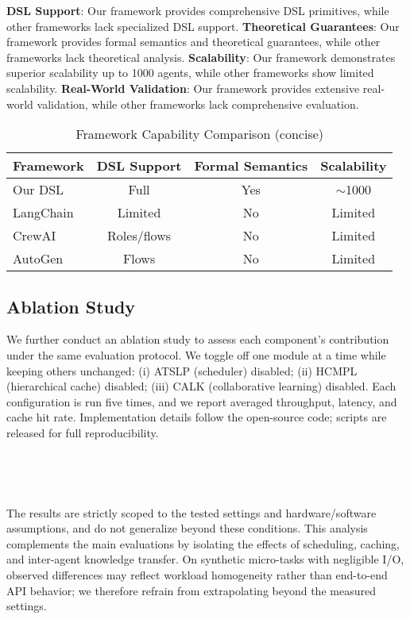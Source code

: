 \documentclass[conference]{IEEEtran}
\begin{document}
\textbf{DSL Support}: Our framework provides comprehensive DSL primitives, while other frameworks lack specialized DSL support.
\textbf{Theoretical Guarantees}: Our framework provides formal semantics and theoretical guarantees, while other frameworks lack theoretical analysis.
\textbf{Scalability}: Our framework demonstrates superior scalability up to 1000 agents, while other frameworks show limited scalability.
\textbf{Real-World Validation}: Our framework provides extensive real-world validation, while other frameworks lack comprehensive evaluation.

\begin{table}[htbp]
\caption{Framework Capability Comparison (concise)}
\label{tab:framework_compare}
\centering
\begin{tabular}{@{}lccc@{}}
\toprule
Framework & DSL Support & Formal Semantics & Scalability \\
\midrule
Our DSL & Full & Yes & $\sim$1000 \\
LangChain & Limited & No & Limited \\
CrewAI & Roles/flows & No & Limited \\
AutoGen & Flows & No & Limited \\
\bottomrule
\end{tabular}
\end{table}

\subsection{Ablation Study}

We further conduct an ablation study to assess each component's contribution under the same evaluation protocol. We toggle off one module at a time while keeping others unchanged: (i) ATSLP (scheduler) disabled; (ii) HCMPL (hierarchical cache) disabled; (iii) CALK (collaborative learning) disabled. Each configuration is run five times, and we report averaged throughput, latency, and cache hit rate. Implementation details follow the open-source code; scripts are released for full reproducibility.

\

\

The results are strictly scoped to the tested settings and hardware/software assumptions, and do not generalize beyond these conditions. This analysis complements the main evaluations by isolating the effects of scheduling, caching, and inter-agent knowledge transfer. On synthetic micro-tasks with negligible I/O, observed differences may reflect workload homogeneity rather than end-to-end API behavior; we therefore refrain from extrapolating beyond the measured settings.
\end{document}
